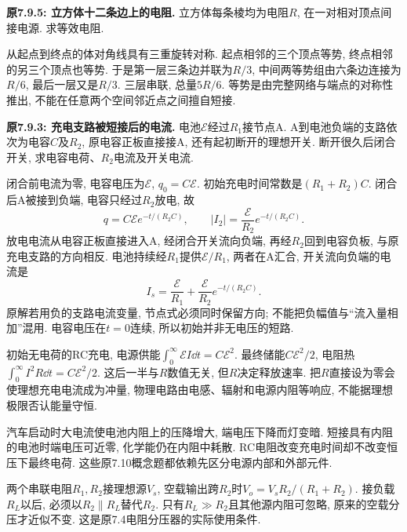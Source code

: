 \begin{example}
\textbf{原7.9.5: 立方体十二条边上的电阻.} \label{ex:resistorcube}
立方体每条棱均为电阻$R$, 在一对相对顶点间接电源. 求等效电阻.
\end{example}
\begin{solution}
从起点到终点的体对角线具有三重旋转对称. 起点相邻的三个顶点等势, 终点相邻的另三个顶点也等势. 于是第一层三条边并联为$R/3$, 中间两等势组由六条边连接为$R/6$, 最后一层又是$R/3$. 三层串联, 总量$5R/6$. 等势是由完整网络与端点的对称性推出, 不能在任意两个空间邻近点之间擅自短接.
\end{solution}

\label{tb:rc-switch}
\begin{example}
\textbf{原7.9.3: 充电支路被短接后的电流.} 
电池$\mathcal E$经过$R_1$接节点A. A到电池负端的支路依次为电容$C$及$R_2$, 原电容正板直接接A, 还有起初断开的理想开关. 断开很久后闭合开关, 求电容电荷、$R_2$电流及开关电流.
\end{example}
\begin{solution}
闭合前电流为零, 电容电压为$\mathcal E$, $q_0=C\mathcal E$. 初始充电时间常数是$(R_1+R_2)C$. 闭合后A被接到负端, 电容只经过$R_2$放电, 故
\[q=C\mathcal E e^{-t/(R_2C)},\qquad |I_2|=\frac{\mathcal E}{R_2}e^{-t/(R_2C)}.\]
放电电流从电容正板直接进入A, 经闭合开关流向负端, 再经$R_2$回到电容负板, 与原充电支路的方向相反. 电池持续经$R_1$提供$\mathcal E/R_1$, 两者在A汇合, 开关流向负端的电流是
\[I_s=\frac{\mathcal E}{R_1}+\frac{\mathcal E}{R_2}e^{-t/(R_2C)}.\]
原解若用负的支路电流变量, 节点式必须同时保留方向; 不能把负幅值与“流入量相加”混用. 电容电压在$t=0$连续, 所以初始并非无电压的短路.
\end{solution}

初始无电荷的RC充电, 电源供能$\int_0^\infty\mathcal EI\dd t=C\mathcal E^2$. 最终储能$C\mathcal E^2/2$, 电阻热$\int_0^\infty I^2R\dd t=C\mathcal E^2/2$. 这后一半与$R$数值无关, 但$R$决定释放速率. 把$R$直接设为零会使理想充电电流成为冲量, 物理电路由电感、辐射和电源内阻等响应, 不能据理想极限否认能量守恒.

汽车启动时大电流使电池内阻上的压降增大, 端电压下降而灯变暗. 短接具有内阻的电池时端电压可近零, 化学能仍在内阻中耗散. RC电阻改变充电时间却不改变恒压下最终电荷. 这些原7.10概念题都依赖先区分电源内部和外部元件.

\label{tb:two-source}
两个串联电阻$R_1,R_2$接理想源$V_s$, 空载输出跨$R_2$时$V_o=V_sR_2/(R_1+R_2)$. 接负载$R_L$以后, 必须以$R_2\parallel R_L$替代$R_2$. 只有$R_L\gg R_2$且其他源内阻可忽略, 原来的空载分压才近似不变. 这是原7.4电阻分压器的实际使用条件.

